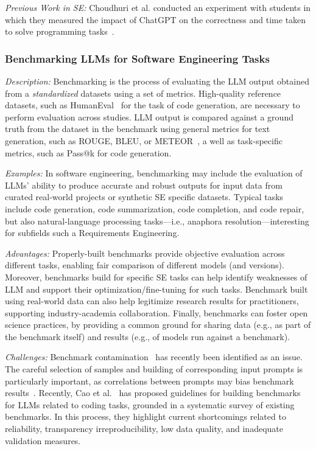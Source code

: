 \documentclass[11pt]{article}
\begin{document}
\emph{Previous Work in SE:}  Choudhuri et al. conducted an experiment with students in which they measured the impact of ChatGPT on the correctness and time taken to solve programming tasks~\cite{DBLP:conf/icse/ChoudhuriLSGS24}.


\subsubsection{Benchmarking LLMs for Software Engineering Tasks}

\emph{Description:} Benchmarking is the process of evaluating the LLM output obtained from a \textit{standardized} datasets using a set of  metrics.
High-quality reference datasets, such as HumanEval~\cite{DBLP:journals/corr/abs-2107-03374} for the task of code generation, are necessary to perform evaluation across studies.
LLM output is compared against a ground truth from the dataset in the benchmark using general metrics for text generation, such as ROUGE, BLEU, or METEOR~\cite{10.1145/3695988}, a well as task-specific metrics, such as Pass@k for code generation.

\emph{Examples:} In software engineering, benchmarking may include the evaluation of LLMs' ability to produce accurate and robust outputs for input data from curated real-world projects or synthetic SE specific datasets. Typical tasks include code generation, code summarization, code completion, and code repair, but also natural-language processing tasks---i.e., anaphora resolution---interesting for subfields such a Requirements Engineering. 

\emph{Advantages:} Properly-built benchmarks provide objective evaluation across different tasks, enabling fair comparison of different models (and versions).
Moreover, benchmarks build for specific SE tasks can help identify weaknesses of LLM and support their optimization/fine-tuning for such tasks.
Benchmark built using real-world data can also help legitimize research results for practitioners, supporting industry-academia collaboration.
Finally, benchmarks can foster open science practices, by providing a common ground for sharing data (e.g., as part of the benchmark itself) and results (e.g., of models run against a benchmark).

\emph{Challenges:} Benchmark contamination~\cite{DBLP:journals/corr/abs-2410-16186} has recently been identified as an issue.
The careful selection of samples and building of corresponding input prompts is particularly important, as correlations between prompts may bias benchmark results~\cite{DBLP:conf/acl/SiskaMAB24}.
Recently, Cao et al.~\cite{cao2025should} has proposed guidelines for building benchmarks for LLMs related to coding tasks, grounded in a systematic survey of existing benchmarks. 
In this process, they highlight current shortcomings related to reliability, transparency irreproducibility, low data quality, and inadequate validation measures.
\end{document}
